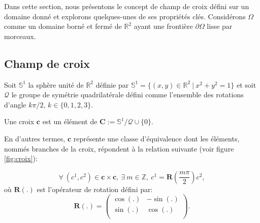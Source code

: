 Dans cette section, nous présentons le concept de champ de croix défini sur un domaine donné et explorons quelques-unes de ses propriétés clés. Considérons $\Omega$ comme un domaine borné et fermé de $\mathbb{R}^2$ ayant une frontière $\partial\Omega$ lisse par morceaux.

\subsection{Champ de croix}

Soit $\mathbb{S}^1$ la sphère unité de $\mathbb{R}^2$ définie par $\mathbb{S}^1=\{(x,y)\in\mathbb{R}^2~|~x^2+y^2=1\}$ et soit $\mathcal{Q}$ le groupe de symétrie quadrilatérale défini comme l'ensemble des rotations d'angle $k\pi/2$, $k\in\{0, 1, 2, 3\}$.

\begin{definition}
\label{def:croix}
  Une croix $\mathbf{c}$ est un élément de $\mathbf{C}:=\mathbb{S}^1/\mathcal{Q}\cup\{0\}$.
\end{definition}

En d'autres termes, $\mathbf{c}$ représente une classe d'équivalence dont les éléments, nommés branches de la croix, répondent à la relation suivante (voir figure \ref{fig:croix}):

\begin{equation}
\label{eq:croix}
\forall~(c^1, c^2)\in\mathbf{c}\times\mathbf{c},~\exists~m\in\mathbb{Z},~c^1=\mathbf{R}\left(\frac{m\pi}{2}\right)c^2,
\end{equation}
où $\mathbf{R}(.)$ est l'opérateur de rotation défini par:
\begin{equation}
\label{eq:matricerotation}
\mathbf{R}(.)=
\begin{pmatrix}
\cos(.) & -\sin(.) \\
\sin(.) & \cos(.) \\
\end{pmatrix}.
\end{equation}

